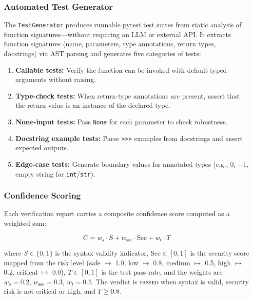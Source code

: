 \documentclass[11pt,a4paper]{article}
\begin{document}
\subsubsection{Automated Test Generator}

The \texttt{TestGenerator} produces runnable pytest test suites from
static analysis of function signatures---without requiring an LLM or
external API.  It extracts function signatures (name, parameters, type
annotations, return types, docstrings) via AST parsing and generates five
categories of tests:

\begin{enumerate}[nosep]
  \item \textbf{Callable tests:} Verify the function can be invoked with
    default-typed arguments without raising.
  \item \textbf{Type-check tests:} When return-type annotations are
    present, assert that the return value is an instance of the declared
    type.
  \item \textbf{None-input tests:} Pass \texttt{None} for each parameter
    to check robustness.
  \item \textbf{Docstring example tests:} Parse \texttt{>>>} examples
    from docstrings and assert expected outputs.
  \item \textbf{Edge-case tests:} Generate boundary values for annotated
    types (e.g., $0$, $-1$, empty string for \texttt{int}/\texttt{str}).
\end{enumerate}

\subsubsection{Confidence Scoring}

Each verification report carries a composite confidence score computed as
a weighted sum:

\begin{equation}
  C = w_s \cdot S + w_{\text{sec}} \cdot \text{Sec} + w_t \cdot T
  \label{eq:confidence}
\end{equation}

\noindent where $S \in \{0, 1\}$ is the syntax validity indicator,
$\text{Sec} \in [0, 1]$ is the security score mapped from the risk level
(safe $\mapsto$ 1.0, low $\mapsto$ 0.8, medium $\mapsto$ 0.5, high
$\mapsto$ 0.2, critical $\mapsto$ 0.0), $T \in [0, 1]$ is the test pass
rate, and the weights are $w_s = 0.2$, $w_{\text{sec}} = 0.3$,
$w_t = 0.5$.  The verdict is \textsc{passed} when syntax is valid,
security risk is not critical or high, and $T \geq 0.8$.
\end{document}
